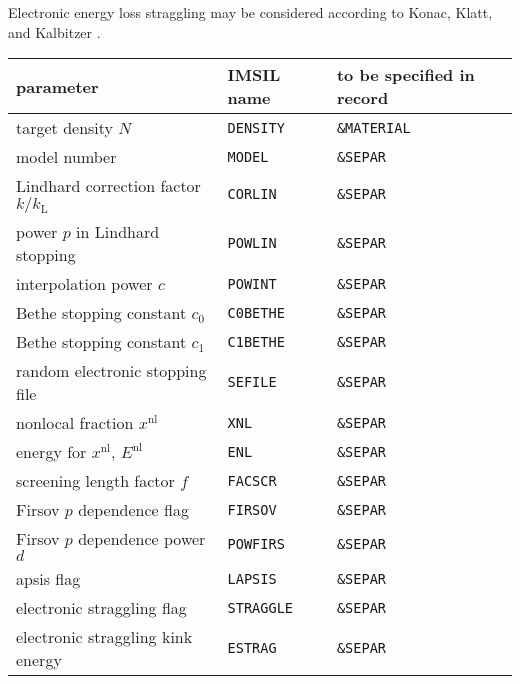 Electronic energy loss straggling may be considered according to Konac, Klatt,
and Kalbitzer \cite{hobler_random_2006, I9848}.

\begin{center}
\begin{tabular}{lll}
   parameter \quad & IMSIL name & to be specified in record \\
   \hline
   target density $N$                      & {\tt DENSITY} & {\tt \&MATERIAL} \\
   model number                               & {\tt MODEL}   & {\tt \&SEPAR} \\
   Lindhard correction factor $k/k_\mathrm{L}$ & {\tt CORLIN} & {\tt \&SEPAR} \\
   power $p$ in Lindhard stopping             & {\tt POWLIN}  & {\tt \&SEPAR} \\
   interpolation power $c$                    & {\tt POWINT}  & {\tt \&SEPAR} \\
   Bethe stopping constant $c_0$              & {\tt C0BETHE} & {\tt \&SEPAR} \\
   Bethe stopping constant $c_1$              & {\tt C1BETHE} & {\tt \&SEPAR} \\
   random electronic stopping file            & {\tt SEFILE}  & {\tt \&SEPAR} \\
   nonlocal fraction $x^\mathrm{nl}$          & {\tt XNL}     & {\tt \&SEPAR} \\
   energy for $x^\mathrm{nl}$, $E^\mathrm{nl}$  & {\tt ENL}   & {\tt \&SEPAR} \\
   screening length factor $f$                & {\tt FACSCR}  & {\tt \&SEPAR} \\
   Firsov $p$ dependence flag                 & {\tt FIRSOV}  & {\tt \&SEPAR} \\
   Firsov $p$ dependence power $d$            & {\tt POWFIRS} & {\tt \&SEPAR} \\
   apsis flag                                 & {\tt LAPSIS}  & {\tt \&SEPAR} \\
   electronic straggling flag                & {\tt STRAGGLE} & {\tt \&SEPAR} \\
   electronic straggling kink energy          & {\tt ESTRAG}  & {\tt \&SEPAR} \\
\end{tabular}
\end{center}
